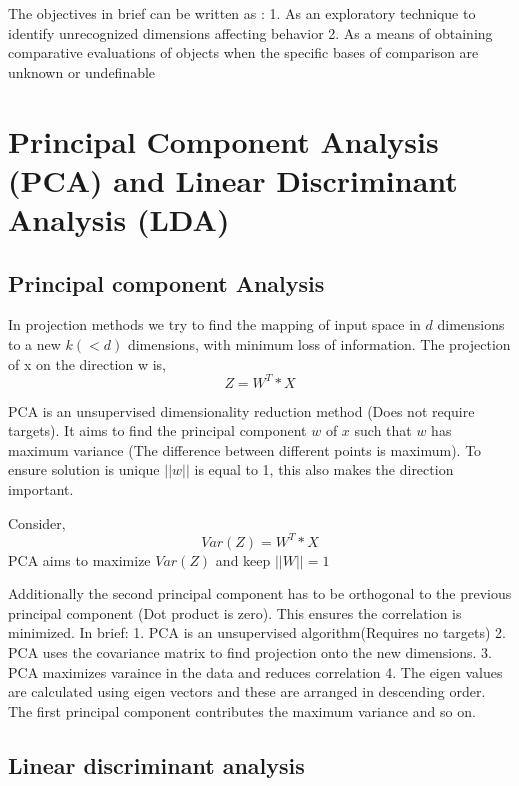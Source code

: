 \documentclass[11pt]{article}
\begin{document}
    The objectives in brief can be written as : 1. As an exploratory
technique to identify unrecognized dimensions affecting behavior 2. As a
means of obtaining comparative evaluations of objects when the specific
bases of comparison are unknown or undefinable

    \hypertarget{principal-component-analysis-pca-and-linear-discriminant-analysis-lda}{%
\section{Principal Component Analysis (PCA) and Linear Discriminant
Analysis
(LDA)}\label{principal-component-analysis-pca-and-linear-discriminant-analysis-lda}}

    \hypertarget{principal-component-analysis}{%
\subsection{Principal component
Analysis}\label{principal-component-analysis}}

    In projection methods we try to find the mapping of input space in \(d\)
dimensions to a new \(k ( < d)\) dimensions, with minimum loss of
information. The projection of x on the direction w is, \[Z = W^{T}*X\]

    PCA is an unsupervised dimensionality reduction method (Does not require
targets). It aims to find the principal component \(w\) of \(x\) such
that \(w\) has maximum variance (The difference between different points
is maximum). To ensure solution is unique \(||w||\) is equal to 1, this
also makes the direction important.

    Consider, \[Var(Z) = W^{T}*X\] PCA aims to maximize \(Var(Z)\) and keep
\(||W|| = 1\)

    Additionally the second principal component has to be orthogonal to the
previous principal component (Dot product is zero). This ensures the
correlation is minimized. In brief: 1. PCA is an unsupervised
algorithm(Requires no targets) 2. PCA uses the covariance matrix to find
projection onto the new dimensions. 3. PCA maximizes varaince in the
data and reduces correlation 4. The eigen values are calculated using
eigen vectors and these are arranged in descending order. The first
principal component contributes the maximum variance and so on.

    \hypertarget{linear-discriminant-analysis}{%
\subsection{Linear discriminant
analysis}\label{linear-discriminant-analysis}}
\end{document}

